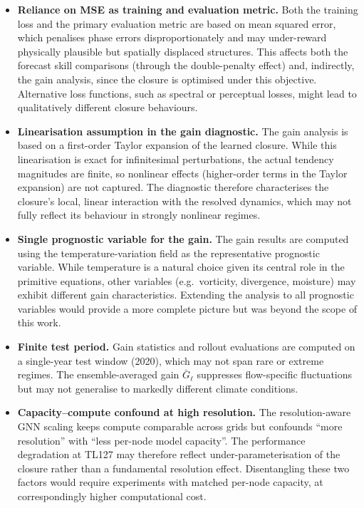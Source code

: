 \begin{itemize}
    \item \textbf{Reliance on MSE as training and evaluation metric.} Both the training loss and the primary evaluation metric are based on mean squared error, which penalises phase errors disproportionately and may under-reward physically plausible but spatially displaced structures. This affects both the forecast skill comparisons (through the double-penalty effect) and, indirectly, the gain analysis, since the closure is optimised under this objective. Alternative loss functions, such as spectral or perceptual losses, might lead to qualitatively different closure behaviours.
    
    \item \textbf{Linearisation assumption in the gain diagnostic.} The gain analysis is based on a first-order Taylor expansion of the learned closure. While this linearisation is exact for infinitesimal perturbations, the actual tendency magnitudes are finite, so nonlinear effects (higher-order terms in the Taylor expansion) are not captured. The diagnostic therefore characterises the closure's local, linear interaction with the resolved dynamics, which may not fully reflect its behaviour in strongly nonlinear regimes.
    
    \item \textbf{Single prognostic variable for the gain.} The gain results are computed using the temperature-variation field as the representative prognostic variable. While temperature is a natural choice given its central role in the primitive equations, other variables (e.g.\ vorticity, divergence, moisture) may exhibit different gain characteristics. Extending the analysis to all prognostic variables would provide a more complete picture but was beyond the scope of this work.
    
    \item \textbf{Finite test period.} Gain statistics and rollout evaluations are computed on a single-year test window (2020), which may not span rare or extreme regimes. The ensemble-averaged gain $\bar{G}_\ell$ suppresses flow-specific fluctuations but may not generalise to markedly different climate conditions.
    
    \item \textbf{Capacity--compute confound at high resolution.} The resolution-aware GNN scaling keeps compute comparable across grids but confounds ``more resolution'' with ``less per-node model capacity''. The performance degradation at TL127 may therefore reflect under-parameterisation of the closure rather than a fundamental resolution effect. Disentangling these two factors would require experiments with matched per-node capacity, at correspondingly higher computational cost.
    

\end{itemize}
